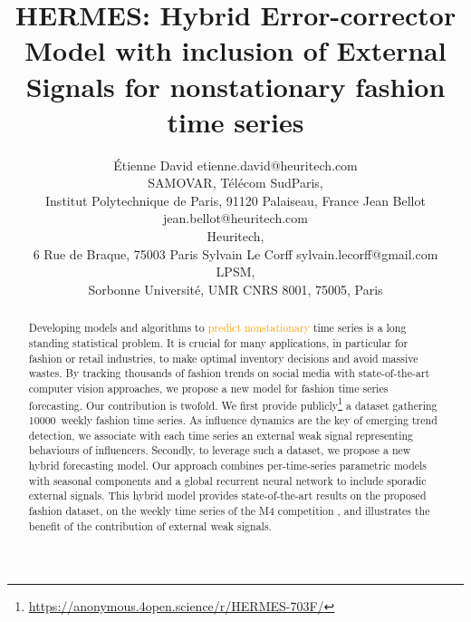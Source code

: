\documentclass[10pt]{article} %
\title{HERMES: Hybrid Error-corrector Model with inclusion of External Signals for nonstationary fashion time series}
\author{\name \'Etienne David \email etienne.david@heuritech.com \\
      \addr SAMOVAR, Télécom SudParis,\\
      Institut Polytechnique de Paris, 91120 Palaiseau, France
      \AND
      \name Jean Bellot \email jean.bellot@heuritech.com \\
      \addr Heuritech, \\
      6 Rue de Braque, 75003 Paris
      \AND
      \name Sylvain Le Corff \email sylvain.lecorff@gmail.com\\
      \addr LPSM, \\
      Sorbonne Université, UMR CNRS 8001, 75005, Paris
      }
\newcommand{\numberts}{10000}
\begin{document}
\maketitle

\begin{abstract}
Developing models and algorithms to \textcolor{orange}{predict nonstationary} time series is a long standing statistical problem. It is crucial for many applications, in particular for fashion or retail industries, to make optimal inventory decisions and avoid massive wastes. By tracking thousands of fashion trends on social media with state-of-the-art computer vision approaches, we propose a new model for fashion time series forecasting. Our contribution is  twofold. We first provide publicly\footnote[1]{\url{https://anonymous.4open.science/r/HERMES-703F/}} a dataset gathering \numberts\ weekly fashion time series. As influence dynamics are the key of emerging trend detection, we associate with each time series an external weak signal representing behaviours of influencers. Secondly, to leverage such a dataset, we propose a new hybrid forecasting model\footnotemark. Our approach combines per-time-series parametric models with seasonal components and a global recurrent neural network to include sporadic external signals. This hybrid model provides state-of-the-art results on the proposed fashion dataset, on the weekly time series of the M4 competition \citep{makridakis2018}, and illustrates the benefit of the contribution of external weak signals.
\end{abstract}
\end{document}
